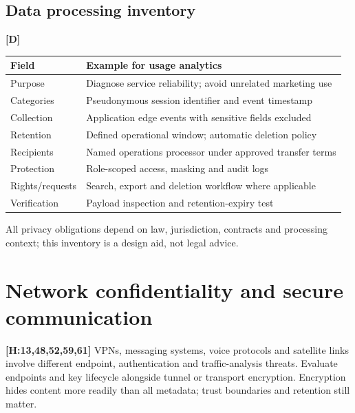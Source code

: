 \documentclass[10pt,letterpaper,oneside]{article}
\newcommand{\handbookref}[1]{\textsf{\color{accent}\textbf{[H:#1]}}}
\newcommand{\designed}{\textsf{\color{accent}\textbf{[D]}}}
\begin{document}
\subsection{Data processing inventory}\designed{}
\par\medskip\noindent\begin{tabularx}{\textwidth}{@{}p{}X@{}}\toprule
Field & Example for usage analytics \\ \midrule
Purpose & Diagnose service reliability; avoid unrelated marketing use\\
Categories & Pseudonymous session identifier and event timestamp\\
Collection & Application edge events with sensitive fields excluded\\
Retention & Defined operational window; automatic deletion policy\\
Recipients & Named operations processor under approved transfer terms\\
Protection & Role-scoped access, masking and audit logs\\
Rights/requests & Search, export and deletion workflow where applicable\\
Verification & Payload inspection and retention-expiry test\\
\bottomrule\end{tabularx}\par\medskip
All privacy obligations depend on law, jurisdiction, contracts and processing context; this inventory is a design aid, not legal advice.

\section{Network confidentiality and secure communication}
\handbookref{13,48,52,59,61} VPNs, messaging systems, voice protocols and satellite links involve different endpoint, authentication and traffic-analysis threats. Evaluate endpoints and key lifecycle alongside tunnel or transport encryption. Encryption hides content more readily than all metadata; trust boundaries and retention still matter.
\end{document}
